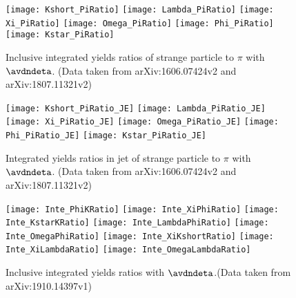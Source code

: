 \begin{figure}[ht]
	\begin{center}
		\texttt{[image: Kshort\_PiRatio]}
		\texttt{[image: Lambda\_PiRatio]}
		\texttt{[image: Xi\_PiRatio]}
		\texttt{[image: Omega\_PiRatio]}
		\texttt{[image: Phi\_PiRatio]}	\texttt{[image: Kstar\_PiRatio]}
	\end{center}
	\caption{Inclusive integrated yields ratios of strange particle to $\pi$ with $\avdndeta$. (Data taken from arXiv:1606.07424v2 and arXiv:1807.11321v2)}
	\label{fig:InclIntePartoPiRatio}
\end{figure}


\begin{figure}[ht]
	\begin{center}
		\texttt{[image: Kshort\_PiRatio\_JE]}
		\texttt{[image: Lambda\_PiRatio\_JE]}
		\texttt{[image: Xi\_PiRatio\_JE]}
		\texttt{[image: Omega\_PiRatio\_JE]}
		\texttt{[image: Phi\_PiRatio\_JE]}
		\texttt{[image: Kstar\_PiRatio\_JE]}
	\end{center}
	\caption{Integrated yields ratios in jet of strange particle to $\pi$ with $\avdndeta$. (Data taken from arXiv:1606.07424v2 and arXiv:1807.11321v2)}
	\label{fig:JEIntePartoPiRatio}
\end{figure}

\begin{figure}[ht]
	\begin{center}
		\texttt{[image: Inte\_PhiKRatio]}		\texttt{[image: Inte\_XiPhiRatio]}
		\texttt{[image: Inte\_KstarKRatio]}
		\texttt{[image: Inte\_LambdaPhiRatio]}
		\texttt{[image: Inte\_OmegaPhiRatio]}
		\texttt{[image: Inte\_XiKshortRatio]}
		\texttt{[image: Inte\_XiLambdaRatio]}
		\texttt{[image: Inte\_OmegaLambdaRatio]}
	\end{center}
	\caption{Inclusive integrated yields ratios with $\avdndeta$.(Data taken from arXiv:1910.14397v1)}
	\label{fig:InclInteParRatio}
\end{figure}

